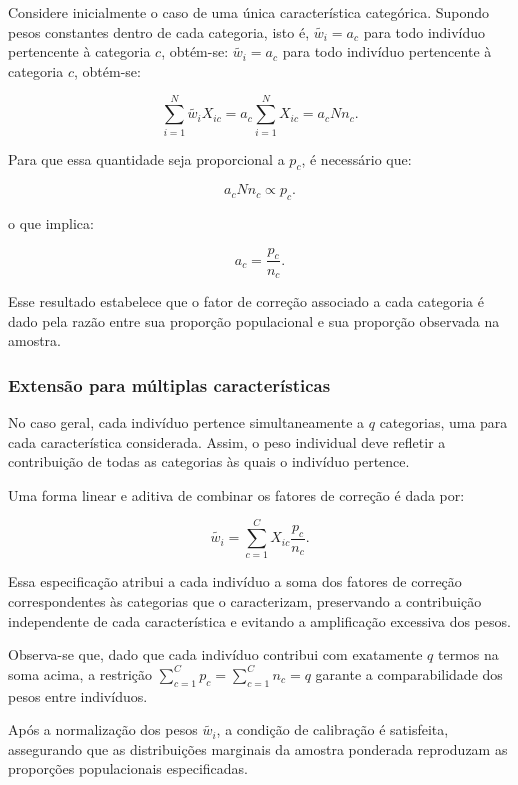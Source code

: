 Considere inicialmente o caso de uma única característica categórica. Supondo pesos constantes dentro de cada categoria, isto é, $\widetilde{w_i} = a_c$ para todo indivíduo pertencente à categoria $c$, obtém-se:
$\widetilde{w_i} = a_c$ para todo indivíduo pertencente à categoria $c$, obtém-se:

\begin{equation}
    \sum_{i=1}^{N} \widetilde{w_i} X_{ic} = a_c \sum_{i=1}^{N} X_{ic} = a_c N n_c.
\end{equation}

Para que essa quantidade seja proporcional a $p_c$, é necessário que:

\begin{equation}
    a_c N n_c \propto p_c.
\end{equation}

o que implica:

\begin{equation}
    a_c = \frac{p_c}{n_c}.
\end{equation}

Esse resultado estabelece que o fator de correção associado a cada categoria é dado pela razão entre sua proporção populacional e sua proporção observada na amostra.

\subsubsection*{Extensão para múltiplas características}

No caso geral, cada indivíduo pertence simultaneamente a $q$ categorias, uma para cada característica considerada. Assim, o peso individual deve refletir a contribuição de todas as categorias às quais o indivíduo pertence.

Uma forma linear e aditiva de combinar os fatores de correção é dada por:

\begin{equation}
    \widetilde{w_i} = \sum_{c=1}^{C} X_{ic} \frac{p_c}{n_c}.
\end{equation}


Essa especificação atribui a cada indivíduo a soma dos fatores de correção correspondentes às categorias que o caracterizam, preservando a contribuição independente de cada característica e evitando a amplificação excessiva dos pesos.

Observa-se que, dado que cada indivíduo contribui com exatamente $q$ termos na soma acima, a restrição $\sum_{c=1}^{C} p_c = \sum_{c=1}^{C} n_c = q$ garante a comparabilidade dos pesos entre indivíduos.

Após a normalização dos pesos $\widetilde{w_i}$, a condição de calibração é satisfeita, assegurando que as distribuições marginais da amostra ponderada reproduzam as proporções populacionais especificadas.
